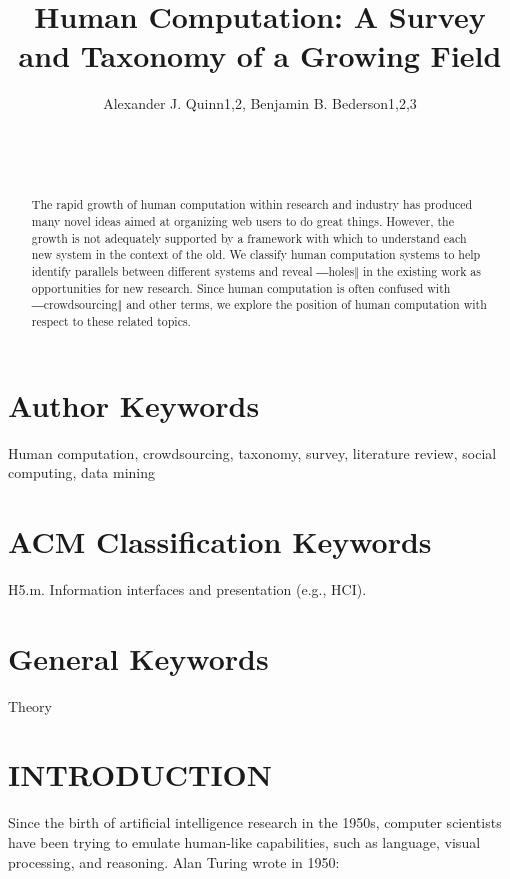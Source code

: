 \documentclass{acm_proc_article-sp} %
\begin{document}
\title{Human Computation: A Survey and Taxonomy of a Growing Field }


\author{
\alignauthor
Alexander J. Quinn1,2, Benjamin B. Bederson1,2,3\\
       \\
       \\
       \\
}

\maketitle

\begin{abstract}
The rapid growth of human computation within research and industry has produced many novel ideas aimed at organizing web users to do great things. However, the growth is not adequately supported by a framework with which to understand each new system in the context of the old. We classify human computation systems to help identify parallels between different systems and reveal ―holes‖ in the existing work as opportunities for new research. Since human computation is often confused with ―crowdsourcing‖ and other terms, we explore the position of human computation with respect to these related topics. 

\end{abstract}

\section{Author Keywords} 
Human computation, crowdsourcing, taxonomy, survey, literature review, social computing, data mining 

\section{ACM Classification Keywords}
H5.m. Information interfaces and presentation (e.g., HCI).  

\section{General Keywords}
Theory 

\section{INTRODUCTION}
Since the birth of artificial intelligence research in the 1950s, computer scientists have been trying to emulate human-like capabilities, such as language, visual processing, and reasoning. Alan Turing wrote in 1950: 
\end{document}
